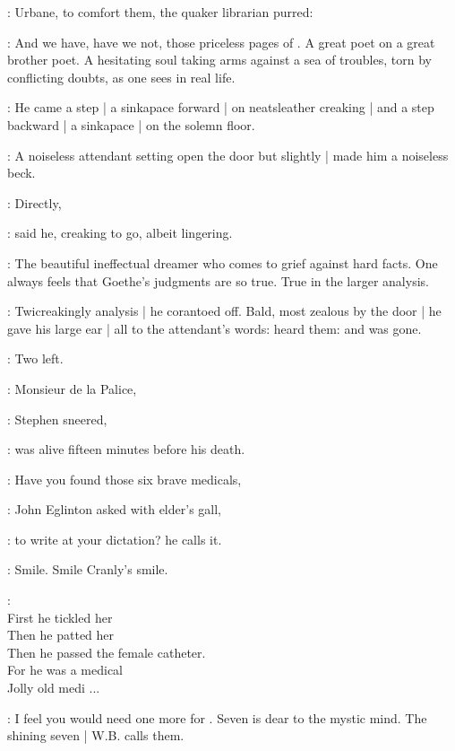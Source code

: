 
:
Urbane, to comfort them,
the quaker librarian purred:

\librarian:
And we have, have we not, those priceless pages of .
A great poet on a great brother poet.
A hesitating soul taking arms against a sea of troubles,
torn by conflicting doubts,
as one sees in real life.

:
He came a step |
a sinkapace forward |
on neatsleather creaking |
and a step backward |
a sinkapace |
on the solemn floor.

:
A noiseless attendant setting open the door but slightly |
made him a noiseless beck.

\librarian:
Directly,

:
said he,
creaking to go, albeit lingering.

\librarian:
The beautiful ineffectual dreamer who comes to grief against hard facts.
One always feels that Goethe's judgments are so true.
True in the larger analysis.

:
Twicreakingly analysis |
he corantoed off.
Bald, most zealous by the door |
he gave his large ear |
all to the attendant's words:
heard them:
and was gone.

\StephenInt:
Two left.

\Stephen:
Monsieur de la Palice,

:
Stephen sneered,

\Stephen:
was alive fifteen minutes before his death.

\eglinton:
Have you found those six brave medicals,

:
John Eglinton asked with elder's gall,

\eglinton:
to write  at your dictation?
he calls it.

\StephenInt:
Smile. Smile Cranly's smile.

\StephenInt: \\
    First he tickled her \\
    Then he patted her \\
    Then he passed the female catheter. \\
    For he was a medical \\
    Jolly old medi ...

\eglinton:
I feel you would need one more for .
Seven is dear to the mystic mind.
The shining seven |
W.B. calls them.

